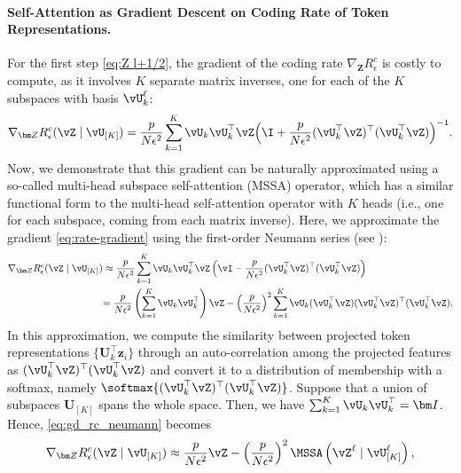 \documentclass[../../book-main.tex]{subfiles}
\begin{document}
\paragraph{Self-Attention as Gradient Descent on Coding Rate of Token Representations.} For the first step \eqref{eq:Z l+1/2}, the gradient of the coding rate \(\nabla_{\bm Z} R^c_\epsilon\) is costly to compute, as it involves \(K\) separate matrix inverses, one for each of the \(K\) subspaces with basis \(\vU_{k}^{\ell}\):
\begin{equation}
    \nabla_{\bm Z} R_{\epsilon}^c(\vZ \mid \vU_{[K]})
    = \frac{p}{N\epsilon^2}\sum_{k=1}^K \vU_k\vU_k^\top\vZ\Big(\I +
    \frac{p}{N\epsilon^2}(\vU_k^\top\vZ)^\top(\vU_k^\top\vZ)\Big)^{-1}.
    \label{eq:rate-gradient}
\end{equation}
Now, we demonstrate that this gradient can be naturally approximated using a so-called multi-head subspace self-attention (MSSA) operator, which has a similar functional form to the multi-head self-attention operator \citep{vaswani2017attention} with \(K\) heads (i.e., one for each subspace, coming from each matrix inverse). Here, we approximate the gradient \eqref{eq:rate-gradient} using the first-order Neumann series (see ):
\begin{align}\label{eq:gd_rc_neumann}
    \nabla_{\bm Z} R_{\epsilon}^{c}(\vZ \mid \vU_{[K]}) 
    &\approx \frac{p}{N\epsilon^2} \sum_{k = 1}^{K}\vU_{k}\vU_{k}^\top\vZ\left(\vI - \frac{p}{N\epsilon^2} (\vU_{k}^\top\vZ)^\top(\vU_{k}^\top\vZ)\right) \notag \\
    &{= \frac{p}{N\epsilon^2} \left(\sum_{k = 1}^{K} \vU_{k}\vU_{k}^\top\right)\vZ -  \left( \frac{p}{N\epsilon^2}\right)^2\sum_{k = 1}^{K} \vU_{k}(\vU_{k}^\top\vZ)(\vU_{k}^\top\vZ)^\top(\vU_{k}^\top\vZ)}.
\end{align}
In this approximation, we compute the similarity between projected token representations $\{\bm U_k^\top\bm z_i\}$ through an auto-correlation among the projected features as $(\vU_{k}^\top\vZ)^\top(\vU_{k}^\top\vZ)$ and convert it to a distribution of membership with a softmax, namely $\softmax{(\vU_{k}^\top\vZ)^\top(\vU_{k}^\top\vZ)}$. 
Suppose that a union of subspaces $\bm U_{[K]}$ spans the whole space. Then, we have $\sum_{k = 1}^{K} \vU_{k}\vU_{k}^\top = \bm I$. Hence, \eqref{eq:gd_rc_neumann} becomes
\begin{align}\label{eq:grad Rc}
    \nabla_{\bm Z} R_{\epsilon}^{c}(\vZ \mid \vU_{[K]}) 
     \approx  \frac{p}{N\epsilon^2} \vZ -  \left( \frac{p}{N\epsilon^2}\right)^2 \MSSA\left(\vZ^{\ell} \mid \vU_{[K]}^{\ell}\right),
\end{align}
\end{document}
